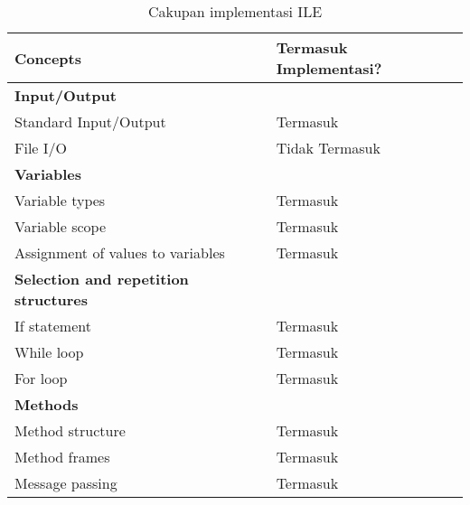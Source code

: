 \footnotesize
\begin{longtable}[c]{|l|l|}
  \caption{Cakupan implementasi ILE}
  \label{tab:ile-scope}                                                              \\
  \hline
  \rowcolor{gray!30}
  \normalsize\textbf{Concepts}                  & \normalsize Termasuk Implementasi? \\ \hline
  \endhead
  \textbf{Input/Output}                         &                                    \\ \hline
  Standard Input/Output                         & Termasuk                           \\ \hline
  File I/O                                      & Tidak Termasuk                     \\ \hline
  \textbf{Variables}                            &                                    \\ \hline
  Variable types                                & Termasuk                           \\ \hline
  Variable scope                                & Termasuk                           \\ \hline
  Assignment of values to variables             & Termasuk                           \\ \hline
  \textbf{Selection and repetition structures}  &                                    \\ \hline
  If statement                                  & Termasuk                           \\ \hline
  While loop                                    & Termasuk                           \\ \hline
  For loop                                      & Termasuk                           \\ \hline
  \textbf{Methods}                              &                                    \\ \hline
  Method structure                              & Termasuk                           \\ \hline
  Method frames                                 & Termasuk                           \\ \hline
  Message passing                               & Termasuk                           \\ \hline

\end{longtable}
